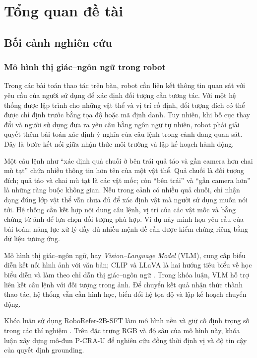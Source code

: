 \chapter{Tổng quan đề tài}
\label{sec:introduction}

\section{Bối cảnh nghiên cứu}
\label{sec:introduction-context}

\subsection{Mô hình thị giác--ngôn ngữ trong robot}

Trong các bài toán thao tác trên bàn, robot cần liên kết thông tin quan sát với yêu cầu của người sử dụng để xác định đối tượng cần tương tác. Với một hệ thống được lập trình cho những vật thể và vị trí cố định, đối tượng đích có thể được chỉ định trước bằng tọa độ hoặc mã định danh. Tuy nhiên, khi bố cục thay đổi và người sử dụng đưa ra yêu cầu bằng ngôn ngữ tự nhiên, robot phải giải quyết thêm bài toán xác định ý nghĩa của câu lệnh trong cảnh đang quan sát. Đây là bước kết nối giữa nhận thức môi trường và lập kế hoạch hành động.

Một câu lệnh như ``xác định quả chuối ở bên trái quả táo và gần camera hơn chai mù tạt'' chứa nhiều thông tin hơn tên của một vật thể. Quả chuối là đối tượng đích; quả táo và chai mù tạt là các vật mốc; còn ``bên trái'' và ``gần camera hơn'' là những ràng buộc không gian. Nếu trong cảnh có nhiều quả chuối, chỉ nhận dạng đúng lớp vật thể vẫn chưa đủ để xác định vật mà người sử dụng muốn nói tới. Hệ thống cần kết hợp nội dung câu lệnh, vị trí của các vật mốc và bằng chứng từ ảnh để lựa chọn đối tượng phù hợp. Ví dụ này minh họa yêu cầu của bài toán; năng lực xử lý đầy đủ nhiều mệnh đề cần được kiểm chứng riêng bằng dữ liệu tương ứng.

Mô hình thị giác--ngôn ngữ, hay \textit{Vision--Language Model} (VLM), cung cấp biểu diễn kết nối hình ảnh với văn bản; CLIP và LLaVA là hai hướng tiêu biểu về học biểu diễn và làm theo chỉ dẫn thị giác--ngôn ngữ \cite{radford2021clip,liu2023llava}. Trong khóa luận, VLM hỗ trợ liên kết câu lệnh với đối tượng trong ảnh. Để chuyển kết quả nhận thức thành thao tác, hệ thống vẫn cần hình học, biến đổi hệ tọa độ và lập kế hoạch chuyển động.

Khóa luận sử dụng RoboRefer-2B-SFT làm mô hình nền và giữ cố định trọng số trong các thí nghiệm \cite{zhou2025roborefer,roborefer2bsftModelCard}. Trên đặc trưng RGB và độ sâu của mô hình này, khóa luận xây dựng mô-đun P-CRA-U để nghiên cứu đồng thời định vị và độ tin cậy của quyết định grounding.

